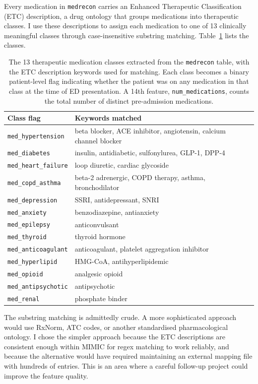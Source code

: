 Every medication in \texttt{medrecon} carries an Enhanced Therapeutic Classification (ETC) description, a drug ontology that groups medications into therapeutic classes. I use these descriptions to assign each medication to one of 13 clinically meaningful classes through case-insensitive substring matching. Table~\ref{tab:med-classes} lists the classes.

\begin{table}[htbp]
 \centering
 \caption[Medication therapeutic classes]{The 13 therapeutic medication classes extracted from the \texttt{medrecon} table, with the ETC description keywords used for matching. Each class becomes a binary patient-level flag indicating whether the patient was on any medication in that class at the time of ED presentation. A 14th feature, \texttt{num\_medications}, counts the total number of distinct pre-admission medications.}
 \label{tab:med-classes}
 \small
 \begin{tabular}{ll}
 \toprule
 Class flag & Keywords matched \\
 \midrule
 \texttt{med\_hypertension} & beta blocker, ACE inhibitor, angiotensin, calcium channel blocker \\
 \texttt{med\_diabetes} & insulin, antidiabetic, sulfonylurea, GLP-1, DPP-4 \\
 \texttt{med\_heart\_failure} & loop diuretic, cardiac glycoside \\
 \texttt{med\_copd\_asthma} & beta-2 adrenergic, COPD therapy, asthma, bronchodilator \\
 \texttt{med\_depression} & SSRI, antidepressant, SNRI \\
 \texttt{med\_anxiety} & benzodiazepine, antianxiety \\
 \texttt{med\_epilepsy} & anticonvulsant \\
 \texttt{med\_thyroid} & thyroid hormone \\
 \texttt{med\_anticoagulant} & anticoagulant, platelet aggregation inhibitor \\
 \texttt{med\_hyperlipid} & HMG-CoA, antihyperlipidemic \\
 \texttt{med\_opioid} & analgesic opioid \\
 \texttt{med\_antipsychotic} & antipsychotic \\
 \texttt{med\_renal} & phosphate binder \\
 \bottomrule
 \end{tabular}
\end{table}

The substring matching is admittedly crude. A more sophisticated approach would use RxNorm, ATC codes, or another standardised pharmacological ontology. I chose the simpler approach because the ETC descriptions are consistent enough within MIMIC for regex matching to work reliably, and because the alternative would have required maintaining an external mapping file with hundreds of entries. This is an area where a careful follow-up project could improve the feature quality.

